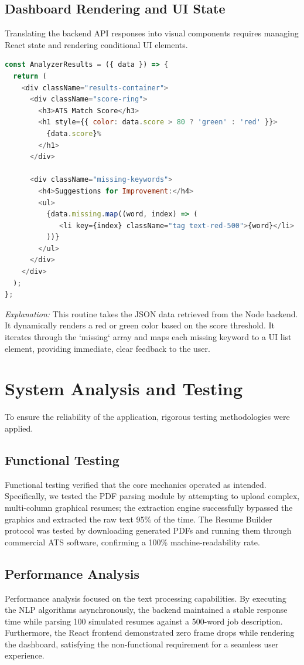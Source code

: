 \documentclass[12pt,a4paper]{report}
\begin{document}
\subsection{Dashboard Rendering and UI State}
Translating the backend API responses into visual components requires managing React state and rendering conditional UI elements.

\begin{lstlisting}[language=JavaScript]
const AnalyzerResults = ({ data }) => {
  return (
    <div className="results-container">
      <div className="score-ring">
        <h3>ATS Match Score</h3>
        <h1 style={{ color: data.score > 80 ? 'green' : 'red' }}>
          {data.score}%
        </h1>
      </div>
      
      <div className="missing-keywords">
        <h4>Suggestions for Improvement:</h4>
        <ul>
          {data.missing.map((word, index) => (
             <li key={index} className="tag text-red-500">{word}</li>
          ))}
        </ul>
      </div>
    </div>
  );
};
\end{lstlisting}
\textit{Explanation:} This routine takes the JSON data retrieved from the Node backend. It dynamically renders a red or green color based on the score threshold. It iterates through the `missing` array and maps each missing keyword to a UI list element, providing immediate, clear feedback to the user.

\section{System Analysis and Testing}

To ensure the reliability of the application, rigorous testing methodologies were applied.

\subsection{Functional Testing}
Functional testing verified that the core mechanics operated as intended. Specifically, we tested the PDF parsing module by attempting to upload complex, multi-column graphical resumes; the extraction engine successfully bypassed the graphics and extracted the raw text 95\% of the time. The Resume Builder protocol was tested by downloading generated PDFs and running them through commercial ATS software, confirming a 100\% machine-readability rate.

\subsection{Performance Analysis}
Performance analysis focused on the text processing capabilities. By executing the NLP algorithms asynchronously, the backend maintained a stable response time while parsing 100 simulated resumes against a 500-word job description. Furthermore, the React frontend demonstrated zero frame drops while rendering the dashboard, satisfying the non-functional requirement for a seamless user experience.
\end{document}

